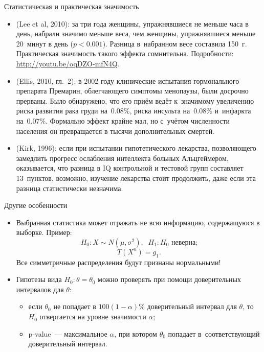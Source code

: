 \documentclass[9pt,pdf,utf8,hyperref={unicode},aspectratio=169]{beamer}
\begin{document}
\begin{frame}{Статистическая и практическая значимость}
{%
		\begin{itemize}
			\item (Lee et al, 2010): за три года женщины, упражнявшиеся не меньше часа в день, набрали значимо меньше веса, чем женщины, упражнявшиеся меньше 20~минут в день ($p<0.001$). 		
			Разница в~набранном весе составила 150~г. 
			Практическая значимость такого эффекта сомнительна. Подробности: \url{http://youtu.be/oqDZO-mfN4Q}.
			\item (Ellis, 2010, гл.~2): в 2002 году клинические испытания гормонального препарата Премарин, облегчающего симптомы менопаузы, были досрочно прерваны. 
			Было обнаружено, что его приём ведёт к~значимому увеличению риска развития рака груди на~0.08\%, риска инсульта на~0.08\% и~инфаркта на~0.07\%.
			Формально эффект крайне мал, но с~учётом численности населения он превращается в тысячи дополнительных смертей.
			\item (Kirk, 1996): если при испытании гипотетического лекарства, позволяющего замедлить прогресс ослабления интеллекта больных Альцгеймером, оказывается, что разница в IQ контрольной и тестовой групп составляет 13~пунктов, возможно, изучение лекарства стоит продолжить, даже если эта разница статистически незначима. 
		\end{itemize}
	}
\end{frame}

\begin{frame}{Другие особенности}
% 
	\begin{itemize}
		\item Выбранная статистика может отражать не всю информацию, содержащуюся в выборке. Пример:
		$$H_0\colon X\sim N\left(\mu, \sigma^2\right), \;\; H_1\colon H_0 \text{ неверна;}$$
		$$T\left(X^n\right)=g_1.$$
		Все симметричные распределения будут признаны нормальными!
		\item Гипотезы вида $H_0\colon \theta=\theta_0$ можно проверять при помощи доверительных интервалов для $\theta$: 
		\begin{itemize}
			\item если $\theta_0$ не попадает в $100\left(1-\alpha\right)$\% доверительный интервал для $\theta$, то $H_0$ отвергается на уровне значимости $\alpha$;
			\item p-value~--- максимальное $\alpha$, при котором $\theta_0$ попадает в~соответствующий доверительный интервал.
		\end{itemize}
	\end{itemize}
\end{frame}
\end{document}
